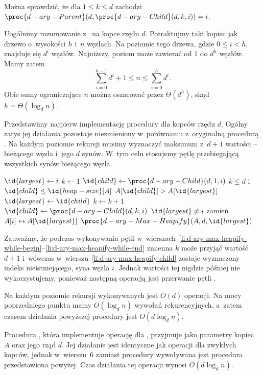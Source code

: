 Można sprawdzić, że dla $1\le k\le d$ zachodzi $\proc{d-ary-Parent}(d,\proc{d-ary-Child}(d,k,i))=i$.

\subproblem %
Uogólnimy rozumowanie z~ na kopce rzędu $d$. Potraktujmy taki kopiec jak drzewo  o~wysokości $h$ i~$n$ węzłach. Na  poziomie tego drzewa, gdzie $0\le i<h$, znajduje się $d^i$ węzłów. Najniższy,  poziom może zawierać od 1 do $d^h$ węzłów. Mamy zatem
\[
    \sum_{i=0}^{h-1}d^i+1 \le n \le \sum_{i=0}^hd^i.
\]
Obie sumy ograniczające $n$ można oszacować przez $\Theta(d^h)$, skąd $h=\Theta(\log_dn)$.

\subproblem %
Przedstawimy najpierw implementację procedury  dla kopców rzędu $d$. Ogólny zarys jej działania pozostaje niezmieniony w~porównaniu z~oryginalną procedurą . Na każdym poziomie rekursji musimy wyznaczyć maksimum z~$d+1$ wartości -- bieżącego węzła i~jego $d$ synów. W~tym celu stosujemy pętlę przebiegającą wszystkich synów bieżącego węzła.
\begin{codebox}
\li	$\id{largest}\gets i$
\li	$k\gets1$
\li	$\id{child}\gets\proc{d-ary-Child}(d,1,i)$
\li	\While $k\le d$ i~$\id{child}\le\id{heap-size}[A]$ \label{li:d-ary-max-heapify-while-begin}
\li		\Do
			\If $A[\id{child}]>A[\id{largest}]$
\li				\Then $\id{largest}\gets\id{child}$
				\End
\li			$k\gets k+1$
\li			$\id{child}\gets\proc{d-ary-Child}(d,k,i)$ \label{li:d-ary-max-heapify-child}
		\End \label{li:d-ary-max-heapify-while-end}
\li	\If $\id{largest}\ne i$
\li		\Then
			zamień $A[i]\leftrightarrow A[\id{largest}]$
\li			$\proc{d-ary-Max-Heapify}(A,d,\id{largest})$
		\End
\end{codebox}
Zauważmy, że podczas wykonywania pętli  w~wierszach~\ref{li:d-ary-max-heapify-while-begin}\nobreakdash--\ref{li:d-ary-max-heapify-while-end} zmienna $k$ może przyjąć wartość $d+1$ i~wówczas w~wierszu~\ref{li:d-ary-max-heapify-child} zostaje wyznaczony indeks nieistniejącego,  syna węzła $i$. Jednak wartości tej nigdzie później nie wykorzystujemy, ponieważ następną operacją jest przerwanie pętli .

Na każdym poziomie rekursji wykonywanych jest $O(d)$ operacji. Na mocy poprzedniego punktu mamy $O(\log_dn)$ wywołań rekurencyjnych, a~zatem czasem działania powyższej procedury jest $O(d\log_dn)$.

Procedura , która implementuje operację  dla , przyjmuje jako parametry kopiec $A$ oraz jego rząd $d$. Jej działanie jest identyczne jak operacji  dla zwykłych kopców, jednak w~wierszu~6 zamiast procedury  wywoływana jest procedura  przedstawiona powyżej. Czas działania tej operacji wynosi $O(d\log_dn)$.

